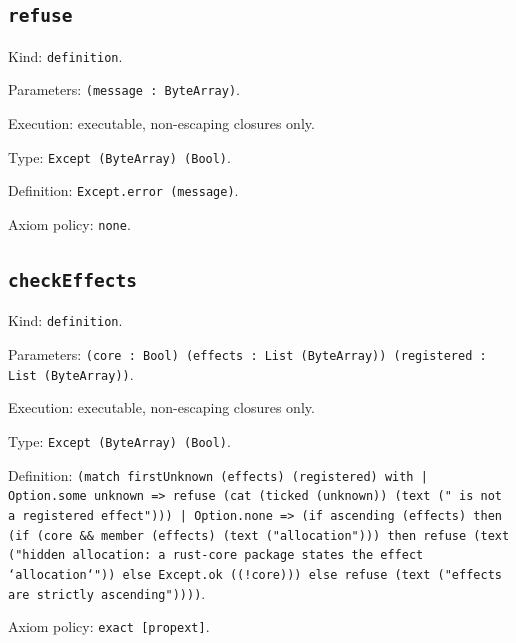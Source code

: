 \documentclass[11pt]{article}
\begin{document}
\subsection*{\texttt{refuse}}
\noindent Kind: \texttt{definition}.\par
\noindent Parameters: \texttt{(message : ByteArray)}.\par
\noindent Execution: executable, non-escaping closures only.\par
\noindent Type: \texttt{Except (ByteArray) (Bool)}.\par
\noindent Definition: \texttt{Except.error (message)}.\par
\noindent Axiom policy: \texttt{none}.\par
\subsection*{\texttt{checkEffects}}
\noindent Kind: \texttt{definition}.\par
\noindent Parameters: \texttt{(core : Bool) (effects : List (ByteArray)) (registered : List (ByteArray))}.\par
\noindent Execution: executable, non-escaping closures only.\par
\noindent Type: \texttt{Except (ByteArray) (Bool)}.\par
\noindent Definition: \texttt{(match firstUnknown (effects) (registered) with | Option.some unknown => refuse (cat (ticked (unknown)) (text (" is not a registered effect"))) | Option.none => (if ascending (effects) then (if (core \&\& member (effects) (text ("allocation"))) then refuse (text ("hidden allocation: a rust-core package states the effect `allocation`")) else Except.ok ((!core))) else refuse (text ("effects are strictly ascending"))))}.\par
\noindent Axiom policy: \texttt{exact [propext]}.\par
\end{document}
